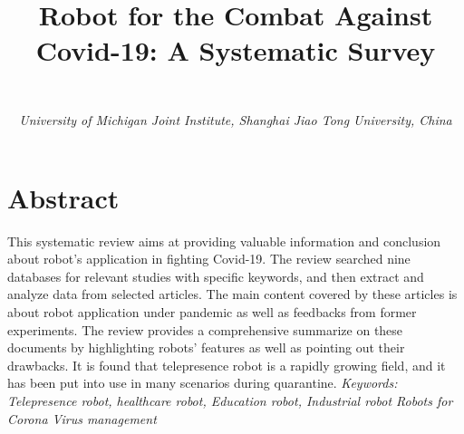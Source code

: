 \documentclass[a4paper]{article}
\title{\Large \textbf{Robot for the Combat Against Covid-19: A Systematic Survey}\\
\author{\textbf{}\\
\emph{University of Michigan Joint Institute, Shanghai Jiao Tong University, China}\\
\date{}
}
}
\begin{document}
\maketitle
\section*{\centering Abstract}
    This systematic review aims at providing valuable information and conclusion about robot's application in fighting Covid-19. The review searched nine databases for relevant studies with specific keywords, and then extract and analyze data from selected articles. The main content covered by these articles is about robot application under pandemic as well as feedbacks from former experiments. The review provides a comprehensive summarize on these documents by highlighting robots' features as well as pointing out their drawbacks. It is found that telepresence robot is a rapidly growing field, and it has been put into use in many scenarios during quarantine.
\emph{Keywords:
Telepresence robot, healthcare robot, Education robot, Industrial robot
Robots for Corona Virus management}
\end{document}
